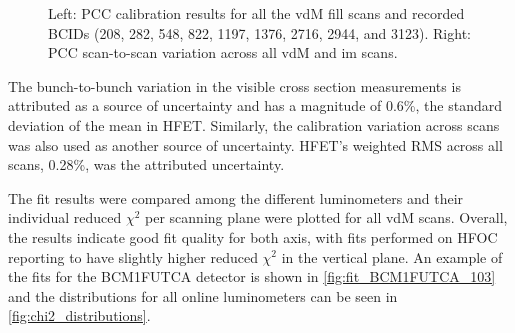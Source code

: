 \begin{figure}[!htb]
	\centering
	\caption[PCC calibration results]{Left: PCC calibration results for all the vdM fill scans and recorded BCIDs (208, 282, 548, 822, 1197, 1376, 2716, 2944, and 3123). Right: PCC scan-to-scan variation across all vdM and im scans.
	}
	\label{fig:cross_section_results_pcc}
\end{figure}

The bunch-to-bunch variation in the visible cross section measurements is attributed as a source of uncertainty and has a magnitude of 0.6\%, the standard deviation of the mean in HFET. Similarly, the calibration variation across scans was also used as another source of uncertainty. HFET's weighted RMS across all scans, 0.28\%, was the attributed uncertainty.

The fit results were compared among the different luminometers and their individual reduced $\chi^2$ per scanning plane were plotted for all vdM scans. Overall, the results indicate good fit quality for both axis, with fits performed on HFOC reporting to have slightly higher reduced $\chi^2$ in the vertical plane. An example of the fits for the BCM1FUTCA detector is shown in \autoref{fig:fit_BCM1FUTCA_103} and the distributions for all online luminometers can be seen in \autoref{fig:chi2_distributions}.

